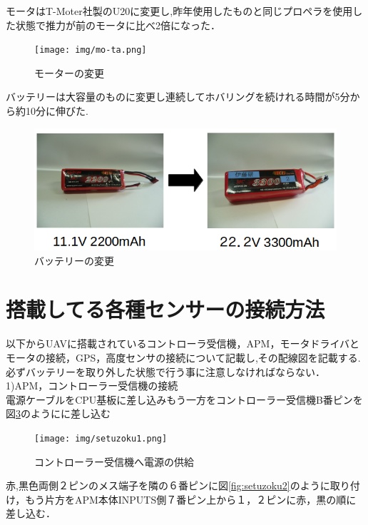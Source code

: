 \documentclass[12pt,oneside]{sotsuken_paper}
\begin{document}
モータはT-Moter社製のU20に変更し,昨年使用したものと同じプロペラを使用した状態で推力が前のモータに比べ2倍になった．

\begin{figure}[H]
\begin{center}
\texttt{[image: img/mo-ta.png]}
\end{center}
\caption{モーターの変更}
\label{fig:mo-ta}
\end{figure}

バッテリーは大容量のものに変更し連続してホバリングを続けれる時間が5分から約10分に伸びた.
\begin{figure}[H]
\begin{center}
\includegraphics[width=140mm]{img/denchi.png}
\end{center}
\caption{バッテリーの変更}
\label{fig:denchi}
\end{figure}

\section{搭載してる各種センサーの接続方法}
以下からUAVに搭載されているコントローラ受信機，APM，モータドライバとモータの接続，GPS，高度センサの接続について記載し,その配線図を記載する.
必ずバッテリーを取り外した状態で行う事に注意しなければならない．\\ 
1)APM，コントローラー受信機の接続\\
電源ケーブルをCPU基板に差し込みもう一方をコントローラー受信機B番ピンを図\ref{fig:setuzoku1}のようにに差し込む\\

\begin{figure}[H]
\begin{center}
\texttt{[image: img/setuzoku1.png]}
\end{center}
\caption{コントローラー受信機へ電源の供給}
\label{fig:setuzoku1}
\end{figure}

赤,黒色両側２ピンのメス端子を隣の６番ピンに図\ref{fig:setuzoku2}のように取り付け，もう片方をAPM本体INPUTS側７番ピン上から１，２ピンに赤，黒の順に差し込む．\\
\end{document}
